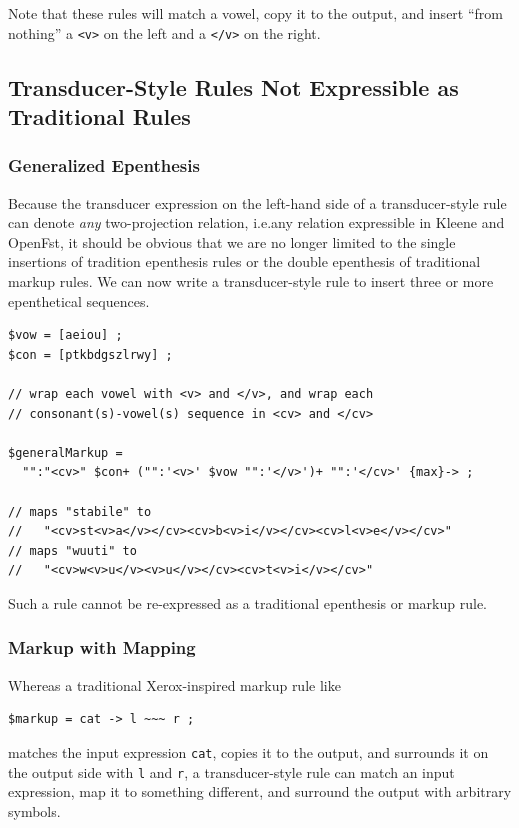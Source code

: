 \noindent
Note that these rules will match a vowel, copy it to the output, and 
insert ``from nothing'' a \verb!<v>!
on the left and a \verb!</v>! on the right.


\subsection{Transducer-Style Rules Not Expressible as Traditional Rules}

\subsubsection{Generalized Epenthesis}

Because the transducer expression on the left-hand side of a transducer-style rule can denote
\emph{any} two-projection relation, i.e.\@ any relation expressible in Kleene and OpenFst, 
it should be obvious that we are no longer limited to the single insertions of tradition
epenthesis rules or the double epenthesis of traditional
markup rules.  We can now write a transducer-style rule to insert three or more epenthetical sequences.

\begin{Verbatim}
$vow = [aeiou] ;
$con = [ptkbdgszlrwy] ;

// wrap each vowel with <v> and </v>, and wrap each 
// consonant(s)-vowel(s) sequence in <cv> and </cv>

$generalMarkup = 
  "":"<cv>" $con+ ("":'<v>' $vow "":'</v>')+ "":'</cv>' {max}-> ;

// maps "stabile" to 
//   "<cv>st<v>a</v></cv><cv>b<v>i</v></cv><cv>l<v>e</v></cv>"
// maps "wuuti" to 
//   "<cv>w<v>u</v><v>u</v></cv><cv>t<v>i</v></cv>"
\end{Verbatim}

\noindent
Such a rule cannot be re-expressed as a traditional epenthesis or markup rule.

\subsubsection{Markup with Mapping}

Whereas a traditional Xerox-inspired markup rule like

\begin{Verbatim}
$markup = cat -> l ~~~ r ;
\end{Verbatim}

\noindent
matches the input expression \verb!cat!, copies it to the output, and surrounds it on the output side with \verb!l! and \verb!r!, a
transducer-style rule can match an input expression, map it to something different, and
surround the output with arbitrary symbols.

